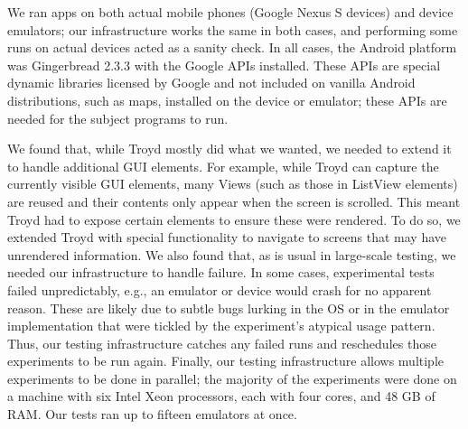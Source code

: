 \documentclass[10pt, conference, compsocconf]{IEEEtran}
\newcommand{\code}[1]{\textsf{#1}}
\begin{document}
{We ran apps on both actual mobile phones (Google Nexus S devices) and
device emulators; our infrastructure works the same in both cases, and
performing some runs on actual devices acted as a sanity check. In all
cases, the Android platform was Gingerbread 2.3.3 with the Google
APIs installed. These APIs are special dynamic libraries licensed by Google and not included 
on vanilla Android distributions, such as maps,
installed on the device or emulator; these APIs are
needed for the subject programs to run.

We found that, while Troyd mostly did what we wanted, we needed to
extend it to handle additional GUI elements.
For example, while Troyd can capture the currently visible GUI elements,
many \code{Views} (such as those in \code{ListView} elements) are 
reused and their contents only appear when the screen is scrolled.
This meant Troyd had to expose certain elements to ensure these were 
rendered.  To do so, we extended Troyd with special functionality to 
navigate to screens that may have unrendered information.
We also found that, as is usual in large-scale
testing, we needed our infrastructure to handle failure. In some cases,
experimental tests failed unpredictably, e.g., an emulator
or device would crash for no apparent reason. These are likely due to
subtle bugs lurking in the OS or in the emulator implementation that
were tickled by the experiment's atypical usage pattern. Thus, our
testing infrastructure catches any failed runs and reschedules those
experiments to be run again. Finally, our testing infrastructure allows
multiple experiments to be done in parallel; the majority of the
experiments were done on a machine with six Intel Xeon processors, 
each with four cores, and 48 GB of RAM.  Our tests ran up to fifteen
emulators at once.


\begin{figure}[t!]
  \centering
  \begin{tabular}{ccc}
    

\end{tabular}
\end{figure}}
\end{document}
